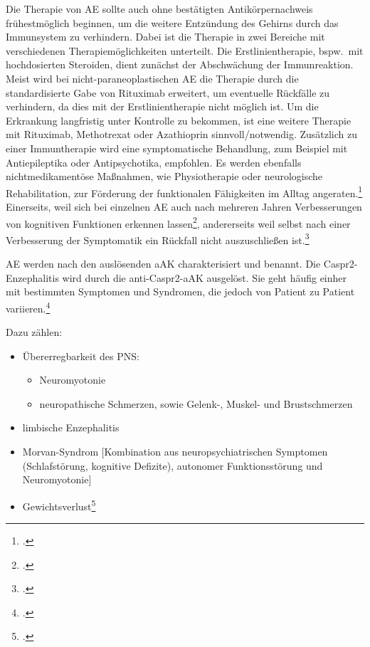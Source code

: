 \documentclass[a4paper, 12pt]{scrreprt}
\begin{document}
    \clearpage
    Die Therapie von AE sollte auch ohne bestätigten Antikörpernachweis
    frühestmöglich beginnen, um die weitere Entzündung des Gehirns durch das
    Immunsystem zu verhindern. Dabei ist die Therapie in zwei Bereiche mit
    verschiedenen Therapiemöglichkeiten unterteilt. Die Erstlinientherapie,
    bspw.\ mit hochdosierten Steroiden, dient zunächst der Abschwächung der
    Immunreaktion. Meist wird bei nicht-paraneoplastischen AE die Therapie
    durch die standardisierte Gabe von Rituximab erweitert, um eventuelle
    Rückfälle zu verhindern, da dies mit der Erstlinientherapie nicht möglich
    ist. Um die Erkrankung langfristig unter Kontrolle zu bekommen, ist eine
    weitere Therapie mit Rituximab, Methotrexat oder Azathioprin
    sinnvoll/notwendig. Zusätzlich zu einer Immuntherapie wird eine
    symptomatische Behandlung, zum Beispiel mit Antiepileptika oder
    Antipsychotika, empfohlen. Es werden ebenfalls nichtmedikamentöse
    Maßnahmen, wie Physiotherapie oder neurologische Rehabilitation, zur
    Förderung der funktionalen Fähigkeiten im Alltag
    angeraten.\footcite[S.~533]{Heine2022}
    Einerseits, weil sich bei einzelnen AE auch nach mehreren Jahren
    Verbesserungen von kognitiven Funktionen erkennen
    lassen\footcite[S.~534]{Heine2022}, andererseits weil selbst nach einer
    Verbesserung der Symptomatik ein Rückfall nicht auszuschließen
    ist.\footcite[S.~11]{Lancaster2015}
    
    
    AE werden nach den auslösenden aAK charakterisiert und benannt. Die
    Caspr2-Enzephalitis wird durch die anti-Caspr2-aAK ausgelöst. Sie geht
    häufig einher mit bestimmten Symptomen und Syndromen, die jedoch von
    Patient zu Patient variieren.\footcite[S.~525--526]{VanSonderen2016}
    
    Dazu zählen:
    \begin{itemize}
    	\item Übererregbarkeit des PNS:
    	\begin{itemize}
    		\item Neuromyotonie
    		\item neuropathische Schmerzen, sowie Gelenk-, Muskel- und
    		Brustschmerzen
    	\end{itemize}
    	\item limbische Enzephalitis
    	\item Morvan-Syndrom [Kombination aus neuropsychiatrischen Symptomen
    	(Schlafstörung, kognitive Defizite), autonomer
    	Funktionsstörung und Neuromyotonie]
    	\item Gewichtsverlust\footcites[S.~523; 526]{VanSonderen2016}%
    	[S.~527; 530]{Heine2022}
    \end{itemize}
    
\end{document}
